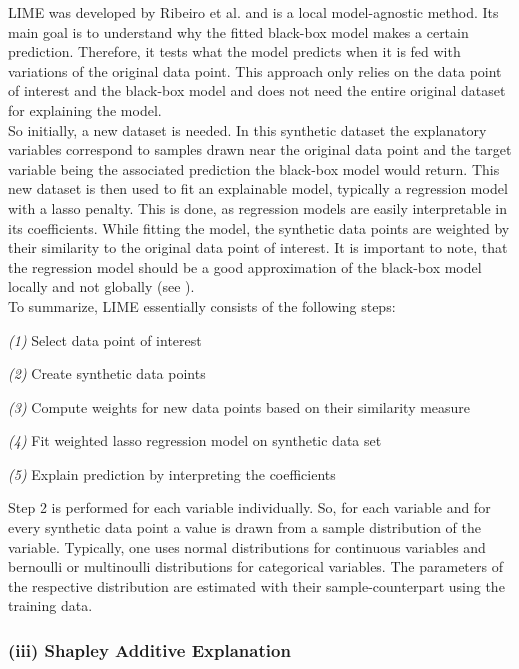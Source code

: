 \documentclass[12pt,titlepage]{article}
\begin{document}
LIME was developed by Ribeiro et al. \cite{lime} and is a local model-agnostic method. Its main goal is to understand why the fitted black-box model makes a certain prediction. Therefore, it tests what the model predicts when it is fed with variations of the original data point. This approach only relies on the data point of interest and the black-box model and does not need the entire original dataset for explaining the model. \\
So initially, a new dataset is needed. In this synthetic dataset the explanatory variables correspond to samples drawn near the original data point and the target variable being the associated prediction the black-box model would return. This new dataset is then used to fit an explainable model, typically a regression model with a lasso penalty. This is done, as regression models are easily interpretable in its coefficients. While fitting the model, the synthetic data points are weighted by their similarity to the original data point of interest. It is important to note, that the regression model should be a good approximation of the black-box model locally and not globally (see \cite{christoph}). \\
To summarize, LIME essentially consists of the following steps:

\vspace{3mm}
\textit{(1)} Select data point of interest \par
\textit{(2)} Create synthetic data points \par
\textit{(3)} Compute weights for new data points based on their similarity measure \par
\textit{(4)} Fit weighted lasso regression model on synthetic data set \par
\textit{(5)} Explain prediction by interpreting the coefficients \\
\vspace{1mm}

\noindent
Step 2 is performed for each variable individually. So, for each variable and for every synthetic data point a value is drawn from a sample distribution of the variable. Typically, one uses normal distributions for continuous variables and bernoulli or multinoulli distributions for categorical variables. The parameters of the respective distribution are estimated with their sample-counterpart using the training data. \\

\subsubsection*{(iii) Shapley Additive Explanation}
\end{document}

